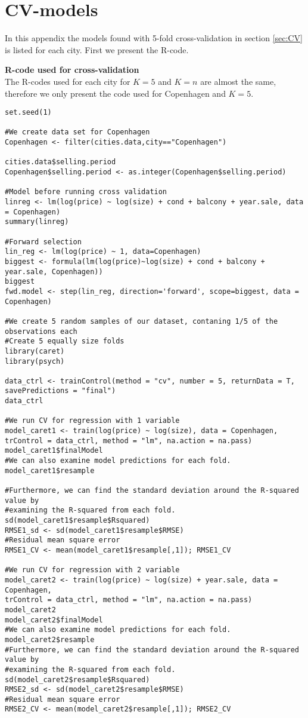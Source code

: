 \chapter{CV-models} \label{aap:cv}
In this appendix the models found with 5-fold cross-validation in section \ref{sec:CV} is listed for each city.
First we present the R-code.

\textbf{R-code used for cross-validation} \\
The R-codes used for each city for $K=5$ and $K=n$ are almost the same, therefore we only present the code used for Copenhagen and $K=5$.
\begin{lstlisting}
set.seed(1)

#We create data set for Copenhagen
Copenhagen <- filter(cities.data,city=="Copenhagen")

cities.data$selling.period
Copenhagen$selling.period <- as.integer(Copenhagen$selling.period)

#Model before running cross validation
linreg <- lm(log(price) ~ log(size) + cond + balcony + year.sale, data = Copenhagen)
summary(linreg)

#Forward selection
lin_reg <- lm(log(price) ~ 1, data=Copenhagen)
biggest <- formula(lm(log(price)~log(size) + cond + balcony + year.sale, Copenhagen))
biggest
fwd.model <- step(lin_reg, direction='forward', scope=biggest, data = Copenhagen)

#We create 5 random samples of our dataset, contaning 1/5 of the observations each
#Create 5 equally size folds
library(caret)
library(psych)

data_ctrl <- trainControl(method = "cv", number = 5, returnData = T, 
savePredictions = "final")
data_ctrl
  
#We run CV for regression with 1 variable
model_caret1 <- train(log(price) ~ log(size), data = Copenhagen, 
trControl = data_ctrl, method = "lm", na.action = na.pass)
model_caret1$finalModel
#We can also examine model predictions for each fold.
model_caret1$resample

#Furthermore, we can find the standard deviation around the R-squared value by
#examining the R-squared from each fold.
sd(model_caret1$resample$Rsquared)
RMSE1_sd <- sd(model_caret1$resample$RMSE)
#Residual mean square error
RMSE1_CV <- mean(model_caret1$resample[,1]); RMSE1_CV  

#We run CV for regression with 2 variable
model_caret2 <- train(log(price) ~ log(size) + year.sale, data = Copenhagen,
trControl = data_ctrl, method = "lm", na.action = na.pass)
model_caret2
model_caret2$finalModel
#We can also examine model predictions for each fold.
model_caret2$resample
#Furthermore, we can find the standard deviation around the R-squared value by
#examining the R-squared from each fold.
sd(model_caret2$resample$Rsquared)
RMSE2_sd <- sd(model_caret2$resample$RMSE)
#Residual mean square error
RMSE2_CV <- mean(model_caret2$resample[,1]); RMSE2_CV 


\end{lstlisting}
